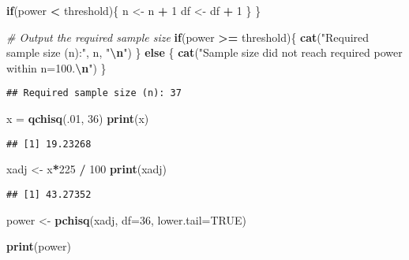 \documentclass[
]{article}
\newenvironment{Shaded}{\begin{snugshade}}{\end{snugshade}}
\newcommand{\AttributeTok}[1]{\textcolor[rgb]{0.13,0.29,0.53}{#1}}
\newcommand{\CommentTok}[1]{\textcolor[rgb]{0.56,0.35,0.01}{\textit{#1}}}
\newcommand{\ConstantTok}[1]{\textcolor[rgb]{0.56,0.35,0.01}{#1}}
\newcommand{\ControlFlowTok}[1]{\textcolor[rgb]{0.13,0.29,0.53}{\textbf{#1}}}
\newcommand{\DecValTok}[1]{\textcolor[rgb]{0.00,0.00,0.81}{#1}}
\newcommand{\FunctionTok}[1]{\textcolor[rgb]{0.13,0.29,0.53}{\textbf{#1}}}
\newcommand{\NormalTok}[1]{#1}
\newcommand{\OtherTok}[1]{\textcolor[rgb]{0.56,0.35,0.01}{#1}}
\newcommand{\SpecialCharTok}[1]{\textcolor[rgb]{0.81,0.36,0.00}{\textbf{#1}}}
\newcommand{\StringTok}[1]{\textcolor[rgb]{0.31,0.60,0.02}{#1}}
\begin{document}
\begin{Shaded}
\begin{Highlighting}[]
  \ControlFlowTok{if}\NormalTok{(power }\SpecialCharTok{\textless{}}\NormalTok{ threshold)\{}
\NormalTok{    n }\OtherTok{\textless{}{-}}\NormalTok{ n }\SpecialCharTok{+} \DecValTok{1}
\NormalTok{    df }\OtherTok{\textless{}{-}}\NormalTok{ df }\SpecialCharTok{+} \DecValTok{1}
\NormalTok{  \}}
\NormalTok{\}}

\CommentTok{\# Output the required sample size}
\ControlFlowTok{if}\NormalTok{(power }\SpecialCharTok{\textgreater{}=}\NormalTok{ threshold)\{}
  \FunctionTok{cat}\NormalTok{(}\StringTok{"Required sample size (n):"}\NormalTok{, n, }\StringTok{"}\SpecialCharTok{\textbackslash{}n}\StringTok{"}\NormalTok{)}
\NormalTok{\} }\ControlFlowTok{else}\NormalTok{ \{}
  \FunctionTok{cat}\NormalTok{(}\StringTok{"Sample size did not reach required power within n=100.}\SpecialCharTok{\textbackslash{}n}\StringTok{"}\NormalTok{)}
\NormalTok{\}}
\end{Highlighting}
\end{Shaded}

\begin{verbatim}
## Required sample size (n): 37
\end{verbatim}

\begin{Shaded}
\begin{Highlighting}[]
\NormalTok{x }\OtherTok{=} \FunctionTok{qchisq}\NormalTok{(.}\DecValTok{01}\NormalTok{, }\DecValTok{36}\NormalTok{)}
\FunctionTok{print}\NormalTok{(x)}
\end{Highlighting}
\end{Shaded}

\begin{verbatim}
## [1] 19.23268
\end{verbatim}

\begin{Shaded}
\begin{Highlighting}[]
\NormalTok{xadj }\OtherTok{\textless{}{-}}\NormalTok{ x}\SpecialCharTok{*}\DecValTok{225} \SpecialCharTok{/} \DecValTok{100}
\FunctionTok{print}\NormalTok{(xadj)}
\end{Highlighting}
\end{Shaded}

\begin{verbatim}
## [1] 43.27352
\end{verbatim}

\begin{Shaded}
\begin{Highlighting}[]
\NormalTok{power }\OtherTok{\textless{}{-}} \FunctionTok{pchisq}\NormalTok{(xadj, }\AttributeTok{df=}\DecValTok{36}\NormalTok{, }\AttributeTok{lower.tail=}\ConstantTok{TRUE}\NormalTok{)}

\FunctionTok{print}\NormalTok{(power)}
\end{Highlighting}
\end{Shaded}
\end{document}
